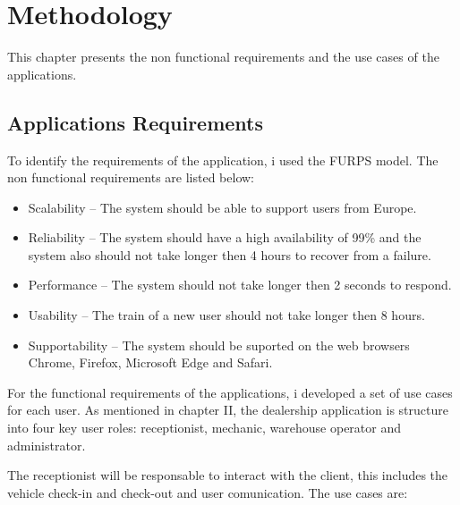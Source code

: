\chapter{Methodology}%
\label{chapter:methodology}

\begin{introduction}
This chapter presents the non functional requirements and the use cases of the applications. 
\end{introduction} 




\section{Applications Requirements} 


To identify the requirements of the application, i used the FURPS model. 
The non functional requirements are listed below:

\begin{itemize}
  \item Scalability – The system should be able to support users from Europe.
  \item Reliability – The system should have a high availability of 99\% and the system also should not take longer then 4 hours to recover from a failure.
  \item Performance – The system should not take longer then 2 seconds to respond.
  \item Usability – The train of a new user should not take longer then 8 hours.
  \item Supportability – The system should be suported on the web browsers Chrome, Firefox, Microsoft Edge and Safari.
\end{itemize}

For the functional requirements of the applications, i developed a set of use cases for each user.
As mentioned in chapter II, the dealership application is structure into four key user roles: receptionist, mechanic, warehouse operator and administrator.

The receptionist will be responsable to interact with the client, this includes the vehicle check-in and check-out and user comunication. 
The use cases are:

